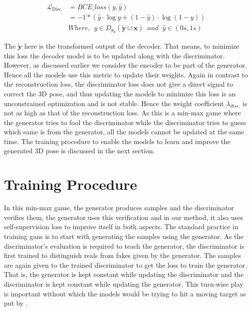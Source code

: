 \begin{equation} \label{eqn:loss_bce}
    \begin{split}
        \mathcal{L}_{\text {Disc.}} & = BCE\_loss(y, \hat{y}) \\
        & = -1 * (\hat{y} \cdot \log y + (1 - \hat{y}) \cdot \log (1 - y)) \\
        & Where, \:\: y \in D_{\theta_d}(\tilde{\textbf{y}} \cup \textbf{x}) \;\; and \;\; \hat{y} \in (0s, 1s)
    \end{split}
\end{equation}

The $\tilde{\textbf{y}}$ here is the transformed output of the decoder. That means, to minimize this loss the decoder model is to be updated along with the discriminator. However, as discussed earlier we consider the encoder to be part of the generator. Hence all the models use this metric to update their weights. Again in contrast to the reconstruction loss, the discriminator loss does not give a direct signal to correct the 3D pose, and thus updating the models to minimize this loss is an unconstrained optimization and is not stable. Hence the weight coefficient $\lambda_{disc.}$ is not as high as that of the reconstruction loss. As this is a min-max game where the generator tries to fool the discriminator while the discriminator tries to guess which same is from the generator, all the models cannot be updated at the same time. The training procedure to enable the models to learn and improve the generated 3D pose is discussed in the next section.

\section{Training Procedure}

In this min-max game, the generator produces samples and the discriminator verifies them, the generator uses this verification and in our method, it also uses self-supervision loss to improve itself in both aspects. The standard practice in training \acp{gan} is to start with generating the samples using the generator. As the discriminator's evaluation is required to teach the generator, the discriminator is first trained to distinguish reals from fakes given by the generator. The samples are again given to the trained discriminator to get the loss to train the generator. That is, the generator is kept constant while updating the discriminator and the discriminator is kept constant while updating the generator. This turn-wise play is important without which the models would be trying to hit a moving target as put by \cite{gan_training_google}.

